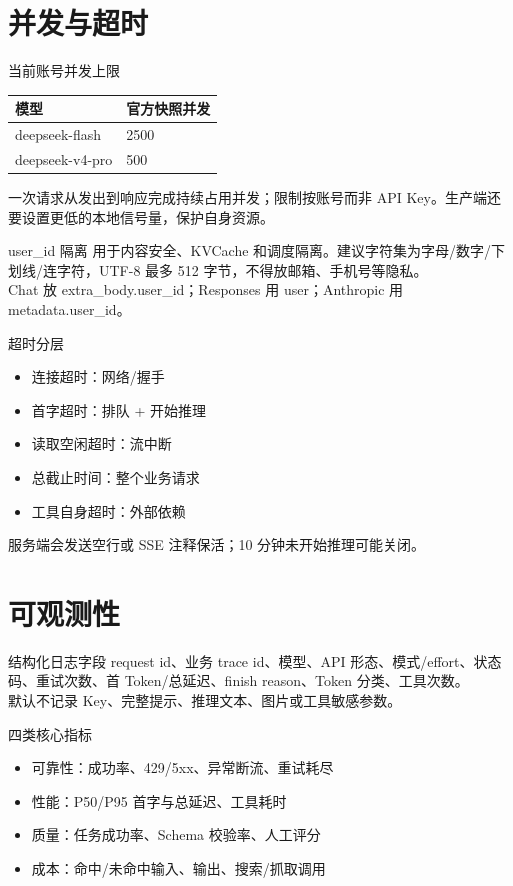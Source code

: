 \documentclass[aspectratio=169,UTF8]{ctexbeamer}
\begin{document}
\section{并发与超时}
\begin{frame}{当前账号并发上限}
\begin{tabular}{ll}
\toprule
模型 & 官方快照并发\\
\midrule
deepseek-flash & 2500\\
deepseek-v4-pro & 500\\
\bottomrule
\end{tabular}
\vspace{6pt}

一次请求从发出到响应完成持续占用并发；限制按账号而非 API Key。生产端还要设置更低的本地信号量，保护自身资源。
\end{frame}
\begin{frame}{user\_id 隔离}
用于内容安全、KVCache 和调度隔离。建议字符集为字母/数字/下划线/连字符，UTF-8 最多 512 字节，不得放邮箱、手机号等隐私。\\[8pt]
Chat 放 extra\_body.user\_id；Responses 用 user；Anthropic 用 metadata.user\_id。
\end{frame}
\begin{frame}{超时分层}
\begin{itemize}
  \item 连接超时：网络/握手
  \item 首字超时：排队 + 开始推理
  \item 读取空闲超时：流中断
  \item 总截止时间：整个业务请求
  \item 工具自身超时：外部依赖
\end{itemize}
服务端会发送空行或 SSE 注释保活；10 分钟未开始推理可能关闭。
\end{frame}
\section{可观测性}
\begin{frame}{结构化日志字段}
request id、业务 trace id、模型、API 形态、模式/effort、状态码、重试次数、首 Token/总延迟、finish reason、Token 分类、工具次数。\\[8pt]
默认不记录 Key、完整提示、推理文本、图片或工具敏感参数。
\end{frame}
\begin{frame}{四类核心指标}
\begin{itemize}
  \item 可靠性：成功率、429/5xx、异常断流、重试耗尽
  \item 性能：P50/P95 首字与总延迟、工具耗时
  \item 质量：任务成功率、Schema 校验率、人工评分
  \item 成本：命中/未命中输入、输出、搜索/抓取调用
\end{itemize}
\end{frame}
\end{document}
